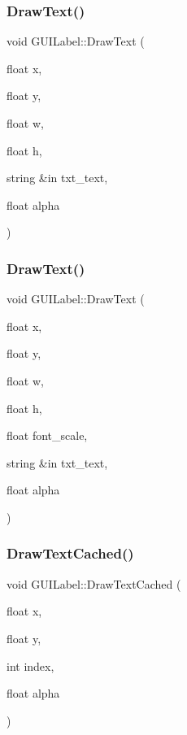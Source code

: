 \subsubsection{\texorpdfstring{Draw\+Text()}{DrawText()}\hspace{0.1cm}{\footnotesize\ttfamily [2/3]}}
{\footnotesize\ttfamily void G\+U\+I\+Label\+::\+Draw\+Text (\begin{DoxyParamCaption}\item[{float}]{x,  }\item[{float}]{y,  }\item[{float}]{w,  }\item[{float}]{h,  }\item[{string \&in}]{txt\+\_\+text,  }\item[{float}]{alpha }\end{DoxyParamCaption})}

\hypertarget{class_g_u_i_label_ac6ba139bbe96a919874a21edf6e15fb3}{}\label{class_g_u_i_label_ac6ba139bbe96a919874a21edf6e15fb3} 
\subsubsection{\texorpdfstring{Draw\+Text()}{DrawText()}\hspace{0.1cm}{\footnotesize\ttfamily [3/3]}}
{\footnotesize\ttfamily void G\+U\+I\+Label\+::\+Draw\+Text (\begin{DoxyParamCaption}\item[{float}]{x,  }\item[{float}]{y,  }\item[{float}]{w,  }\item[{float}]{h,  }\item[{float}]{font\+\_\+scale,  }\item[{string \&in}]{txt\+\_\+text,  }\item[{float}]{alpha }\end{DoxyParamCaption})}

\hypertarget{class_g_u_i_label_a0c350aa1033f7782beb6c681230eabe8}{}\label{class_g_u_i_label_a0c350aa1033f7782beb6c681230eabe8} 
\subsubsection{\texorpdfstring{Draw\+Text\+Cached()}{DrawTextCached()}\hspace{0.1cm}{\footnotesize\ttfamily [1/3]}}
{\footnotesize\ttfamily void G\+U\+I\+Label\+::\+Draw\+Text\+Cached (\begin{DoxyParamCaption}\item[{float}]{x,  }\item[{float}]{y,  }\item[{int}]{index,  }\item[{float}]{alpha }\end{DoxyParamCaption})}

